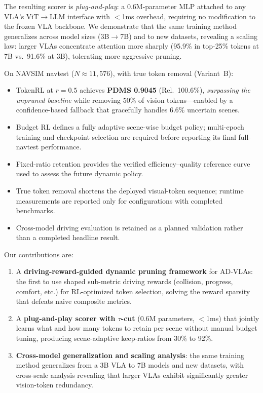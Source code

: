\documentclass[letterpaper]{article} %
\newcommand{\ours}{TokenRL}
\begin{document}
The resulting scorer is \emph{plug-and-play}: a 0.6M-parameter MLP attached to any VLA's ViT$\to$LLM interface with $<$1ms overhead, requiring no modification to the frozen VLA backbone.
We demonstrate that the same training method generalizes across model sizes (3B$\to$7B) and to new datasets, revealing a scaling law: larger VLAs concentrate attention more sharply (95.9\% in top-25\% tokens at 7B vs.\ 91.6\% at 3B), tolerating more aggressive pruning.

On NAVSIM navtest ($N{\approx}11{,}576$), with true token removal (Variant~B):
\begin{itemize}[nosep,leftmargin=*]
\item \ours{} at $r{=}0.5$ achieves \textbf{PDMS 0.9045} (Rel.\ 100.6\%), \emph{surpassing the unpruned baseline} while removing 50\% of vision tokens---enabled by a confidence-based fallback that gracefully handles 6.6\% uncertain scenes.
\item Budget RL defines a fully adaptive scene-wise budget policy; multi-epoch training and checkpoint selection are required before reporting its final full-navtest performance.
\item Fixed-ratio retention provides the verified efficiency--quality reference curve used to assess the future dynamic policy.
\item True token removal shortens the deployed visual-token sequence; runtime measurements are reported only for configurations with completed benchmarks.
\item Cross-model driving evaluation is retained as a planned validation rather than a completed headline result.
\end{itemize}

Our contributions are:
\begin{enumerate}[nosep,leftmargin=*]
\item A \textbf{driving-reward-guided dynamic pruning framework} for AD-VLAs: the first to use shaped sub-metric driving rewards (collision, progress, comfort, etc.) for RL-optimized token selection, solving the reward sparsity that defeats naive composite metrics.
\item A \textbf{plug-and-play scorer with $\tau$-cut} (0.6M parameters, $<$1ms) that jointly learns what and how many tokens to retain per scene without manual budget tuning, producing scene-adaptive keep-ratios from 30\% to 92\%.
\item \textbf{Cross-model generalization and scaling analysis}: the same training method generalizes from a 3B VLA to 7B models and new datasets, with cross-scale analysis revealing that larger VLAs exhibit significantly greater vision-token redundancy.
\end{enumerate}
\end{document}
